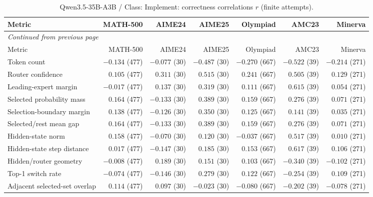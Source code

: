 \begingroup\scriptsize\setlength{\tabcolsep}{4pt}
\begin{longtable}{@{}lrrrrrr@{}}
\caption{Qwen3.5-35B-A3B / Class: Implement: correctness correlations $r$ (finite attempts).}\label{tab:multi-qwen-class-Implement}\\
\toprule
Metric & MATH-500 & AIME24 & AIME25 & Olympiad & AMC23 & Minerva \\
\midrule\endfirsthead
\multicolumn{7}{l}{\textit{Continued from previous page}}\\
\toprule
Metric & MATH-500 & AIME24 & AIME25 & Olympiad & AMC23 & Minerva \\
\midrule\endhead
\bottomrule\endfoot
Token count & $-0.134$ (477) & $-0.077$ (30) & $-0.487$ (30) & $-0.270$ (667) & $-0.522$ (39) & $-0.214$ (271) \\
Router confidence & $0.105$ (477) & $0.311$ (30) & $0.515$ (30) & $0.241$ (667) & $0.505$ (39) & $0.129$ (271) \\
Leading-expert margin & $-0.017$ (477) & $0.137$ (30) & $0.319$ (30) & $0.111$ (667) & $0.615$ (39) & $0.054$ (271) \\
Selected probability mass & $0.164$ (477) & $-0.133$ (30) & $0.389$ (30) & $0.159$ (667) & $0.276$ (39) & $0.071$ (271) \\
Selection-boundary margin & $0.138$ (477) & $-0.126$ (30) & $0.350$ (30) & $0.125$ (667) & $0.141$ (39) & $0.035$ (271) \\
Selected/rest mean gap & $0.164$ (477) & $-0.133$ (30) & $0.389$ (30) & $0.159$ (667) & $0.276$ (39) & $0.071$ (271) \\
Hidden-state norm & $0.158$ (477) & $-0.070$ (30) & $0.120$ (30) & $-0.037$ (667) & $0.517$ (39) & $0.010$ (271) \\
Hidden-state step distance & $0.017$ (477) & $-0.147$ (30) & $0.185$ (30) & $0.153$ (667) & $0.617$ (39) & $0.106$ (271) \\
Hidden/router geometry & $-0.008$ (477) & $0.189$ (30) & $0.151$ (30) & $0.103$ (667) & $-0.340$ (39) & $-0.102$ (271) \\
Top-1 switch rate & $-0.074$ (477) & $-0.146$ (30) & $0.279$ (30) & $0.122$ (667) & $-0.254$ (39) & $0.109$ (271) \\
Adjacent selected-set overlap & $0.114$ (477) & $0.097$ (30) & $-0.023$ (30) & $-0.080$ (667) & $-0.202$ (39) & $-0.078$ (271) \\
\end{longtable}\endgroup

